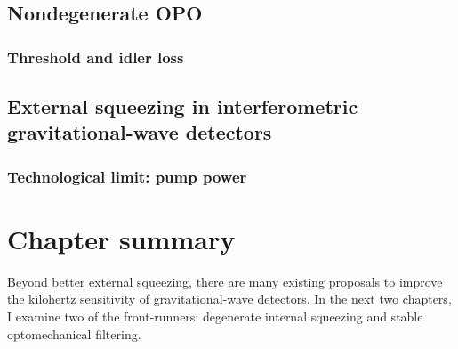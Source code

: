 \subsection{Nondegenerate OPO}


\subsubsection{Threshold and idler loss}


\subsection{External squeezing in interferometric gravitational-wave detectors}


\subsubsection{Technological limit: pump power} 

\section{Chapter summary}

Beyond better external squeezing, there are many  existing proposals to improve the kilohertz sensitivity of gravitational-wave detectors. In the next two chapters, I examine two of the front-runners: degenerate internal squeezing and stable optomechanical filtering.

